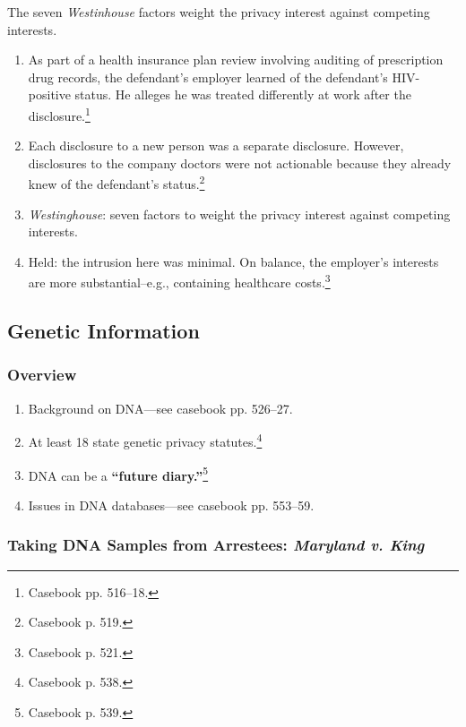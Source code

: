 The seven \emph{Westinhouse} factors weight the privacy interest against 
competing interests.

\begin{enumerate}
    \item As part of a health insurance plan review involving auditing of 
    prescription drug records, the defendant's employer learned of the 
    defendant's HIV-positive status. He alleges he was treated differently at 
    work after the disclosure.\footnote{Casebook pp. 516--18.}
    \item Each disclosure to a new person was a separate disclosure. However, 
    disclosures to the company doctors were not actionable because they already 
    knew of the defendant's status.\footnote{Casebook p.  519.}
    \item \emph{Westinghouse}: seven factors to weight the privacy interest 
    against competing interests.
    \item Held: the intrusion here was minimal. On balance, the employer's 
    interests are more substantial--e.g., containing healthcare 
    costs.\footnote{Casebook p.  521.}
\end{enumerate}

\subsection{Genetic Information}

\subsubsection{Overview}

\begin{enumerate}
    \item Background on DNA---see casebook pp. 526--27.
    \item At least 18 state genetic privacy statutes.\footnote{Casebook p. 538.}
    \item DNA can be a \textbf{``future diary.''}\footnote{Casebook p. 539.}
    \item Issues in DNA databases---see casebook pp. 553--59.
\end{enumerate}

\subsubsection{Taking DNA Samples from Arrestees: \emph{Maryland v. King}}
\label{sub:maryland-v-king}

